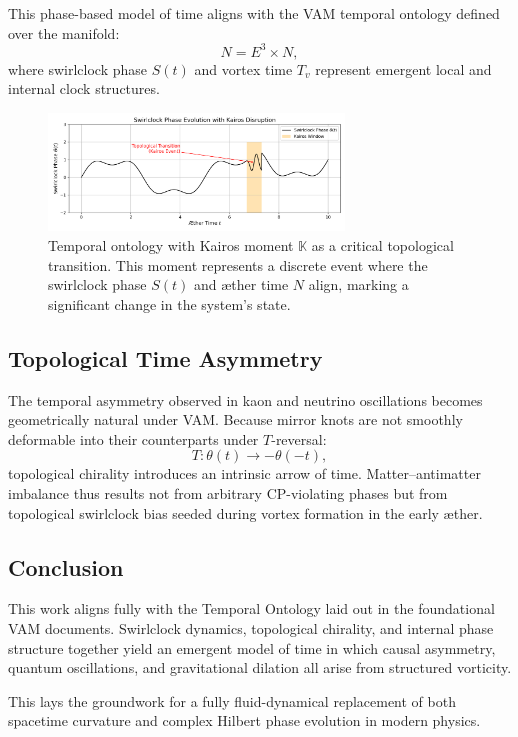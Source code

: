 This phase-based model of time aligns with the VAM temporal ontology defined over the manifold:
\[
N = E^3 \times N,
\]
where swirlclock phase $S(t)$ and vortex time $T_v$ represent emergent local and internal clock structures.

\begin{figure}[H]
    \centering
    \includegraphics[width=0.7\textwidth]{images/TemporalOntologyKairosMoment}
    \caption{ Temporal ontology with Kairos moment $\mathbb{K}$ as a critical topological transition. This moment represents a discrete event where the swirlclock phase $S(t)$ and æther time $N$ align, marking a significant change in the system's state.}
\end{figure}

\subsection*{Topological Time Asymmetry}

The temporal asymmetry observed in kaon and neutrino oscillations becomes geometrically natural under VAM. Because mirror knots are not smoothly deformable into their counterparts under $T$-reversal:
\[
T: \theta(t) \rightarrow -\theta(-t),
\]
topological chirality introduces an intrinsic arrow of time. Matter--antimatter imbalance thus results not from arbitrary CP-violating phases but from topological swirlclock bias seeded during vortex formation in the early æther.

\subsection*{Conclusion}

This work aligns fully with the Temporal Ontology laid out in the foundational VAM documents. Swirlclock dynamics, topological chirality, and internal phase structure together yield an emergent model of time in which causal asymmetry, quantum oscillations, and gravitational dilation all arise from structured vorticity.

This lays the groundwork for a fully fluid-dynamical replacement of both spacetime curvature and complex Hilbert phase evolution in modern physics.
